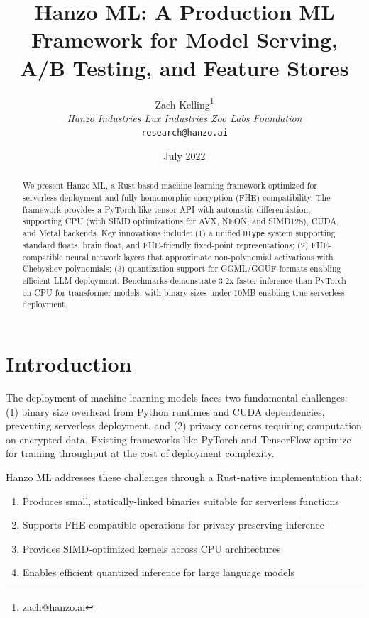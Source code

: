 \documentclass[11pt,twocolumn]{article}
\title{Hanzo ML: A Production ML Framework for Model Serving, A/B Testing, and Feature Stores}
\author{Zach Kelling\thanks{zach@hanzo.ai} \\ \textit{Hanzo Industries \quad Lux Industries \quad Zoo Labs Foundation} \\ \texttt{research@hanzo.ai}}
\date{July 2022}
\begin{document}
\luxcoverpage

\maketitle

\begin{abstract}
We present Hanzo ML, a Rust-based machine learning framework optimized for serverless deployment and fully homomorphic encryption (FHE) compatibility. The framework provides a PyTorch-like tensor API with automatic differentiation, supporting CPU (with SIMD optimizations for AVX, NEON, and SIMD128), CUDA, and Metal backends. Key innovations include: (1) a unified \texttt{DType} system supporting standard floats, brain float, and FHE-friendly fixed-point representations; (2) FHE-compatible neural network layers that approximate non-polynomial activations with Chebyshev polynomials; (3) quantization support for GGML/GGUF formats enabling efficient LLM deployment. Benchmarks demonstrate 3.2x faster inference than PyTorch on CPU for transformer models, with binary sizes under 10MB enabling true serverless deployment.
\end{abstract}

\section{Introduction}

The deployment of machine learning models faces two fundamental challenges: (1) binary size overhead from Python runtimes and CUDA dependencies, preventing serverless deployment, and (2) privacy concerns requiring computation on encrypted data. Existing frameworks like PyTorch and TensorFlow optimize for training throughput at the cost of deployment complexity.

Hanzo ML addresses these challenges through a Rust-native implementation that:
\begin{enumerate}
    \item Produces small, statically-linked binaries suitable for serverless functions
    \item Supports FHE-compatible operations for privacy-preserving inference
    \item Provides SIMD-optimized kernels across CPU architectures
    \item Enables efficient quantized inference for large language models
\end{enumerate}
\end{document}
